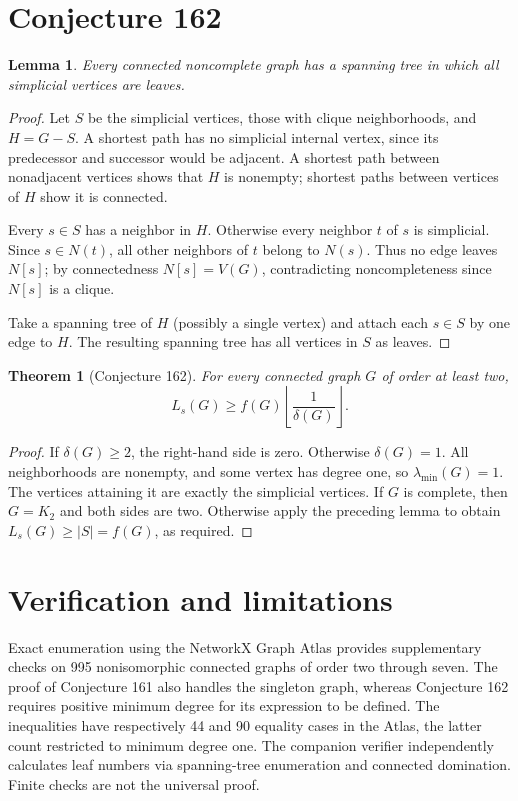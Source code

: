 \documentclass[11pt]{article}
\newtheorem{theorem}{Theorem}
\newtheorem{lemma}{Lemma}
\begin{document}
\section{Conjecture 162}
\begin{lemma}
Every connected noncomplete graph has a spanning tree in which all simplicial vertices are leaves.
\end{lemma}
\begin{proof}
Let $S$ be the simplicial vertices, those with clique neighborhoods, and $H=G-S$. A shortest path has no simplicial internal vertex, since its predecessor and successor would be adjacent. A shortest path between nonadjacent vertices shows that $H$ is nonempty; shortest paths between vertices of $H$ show it is connected.

Every $s\in S$ has a neighbor in $H$. Otherwise every neighbor $t$ of $s$ is simplicial. Since $s\in N(t)$, all other neighbors of $t$ belong to $N(s)$. Thus no edge leaves $N[s]$; by connectedness $N[s]=V(G)$, contradicting noncompleteness since $N[s]$ is a clique.

Take a spanning tree of $H$ (possibly a single vertex) and attach each $s\in S$ by one edge to $H$. The resulting spanning tree has all vertices in $S$ as leaves.
\end{proof}
\begin{theorem}[Conjecture 162]
For every connected graph $G$ of order at least two,
\[
 L_s(G)\ge f(G)\left\lfloor \frac{1}{\delta(G)}\right\rfloor.
\]
\end{theorem}
\begin{proof}
If $\delta(G)\ge 2$, the right-hand side is zero. Otherwise $\delta(G)=1$. All neighborhoods are nonempty, and some vertex has degree one, so $\lambda_{\min}(G)=1$. The vertices attaining it are exactly the simplicial vertices. If $G$ is complete, then $G=K_2$ and both sides are two. Otherwise apply the preceding lemma to obtain $L_s(G)\ge |S|=f(G)$, as required.
\end{proof}
\section{Verification and limitations}
Exact enumeration using the NetworkX Graph Atlas provides supplementary checks on 995 nonisomorphic connected graphs of order two through seven. The proof of Conjecture 161 also handles the singleton graph, whereas Conjecture 162 requires positive minimum degree for its expression to be defined. The inequalities have respectively 44 and 90 equality cases in the Atlas, the latter count restricted to minimum degree one. The companion verifier independently calculates leaf numbers via spanning-tree enumeration and connected domination. Finite checks are not the universal proof.
\end{document}
